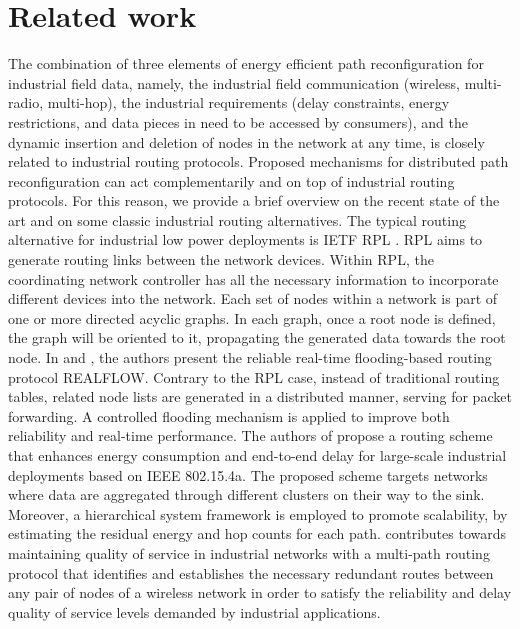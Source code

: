 \section{Related work}
\label{sec::related}

The combination of three elements of energy efficient path reconfiguration for industrial field data, namely, the industrial field communication (wireless, multi-radio, multi-hop), the industrial requirements (delay constraints, energy restrictions, and data pieces in need to be accessed by consumers), and the dynamic insertion and deletion of nodes in the network at any time, is closely related to industrial routing protocols. Proposed mechanisms for distributed path reconfiguration can act complementarily and on top of industrial routing protocols. For this reason, we provide a brief overview on the recent state of the art and on some classic industrial routing alternatives. The typical routing alternative for industrial low power deployments is IETF RPL \cite{rfc6550}. RPL aims to generate routing links between the network devices. Within RPL, the coordinating network controller has all the necessary information to incorporate different devices into the network. Each set of nodes within a network is part of one or more directed acyclic graphs. In each graph, once a root node is defined, the graph will be oriented to it, propagating the generated data towards the root node. In \cite{doi:10.1155/2014/936379} and \cite{7506102}, the authors present the reliable real-time flooding-based routing protocol REALFLOW. Contrary to the RPL case, instead of traditional routing tables, related node lists are generated in a distributed manner, serving for packet forwarding. A controlled flooding mechanism is applied to improve both reliability and real-time performance. The authors of \cite{8338161} propose a routing scheme that enhances energy consumption and end-to-end delay for large-scale industrial deployments based on IEEE 802.15.4a. The proposed scheme targets networks where data are aggregated through different clusters on their way to the sink. Moreover, a hierarchical system framework is employed to promote scalability, by estimating the residual energy and hop counts for each path. \cite{SEPULCRE2016121} contributes towards maintaining quality of service in industrial networks with a multi-path routing protocol that identifies and establishes the necessary redundant routes between any pair of nodes of a wireless network in order to satisfy the reliability and delay quality of service levels demanded by industrial applications.